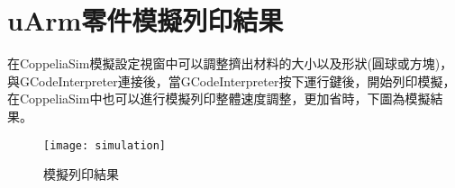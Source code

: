 \section{uArm零件模擬列印結果}
 在CoppeliaSim模擬設定視窗中可以調整擠出材料的大小以及形狀(圓球或方塊)，與GCodeInterpreter連接後，當GCodeInterpreter按下運行鍵後，開始列印模擬，在CoppeliaSim中也可以進行模擬列印整體速度調整，更加省時，下圖為模擬結果。\\
\begin{figure}[hbt!]
\begin{center}
\texttt{[image: simulation]}
\caption{\Large 模擬列印結果}\label{simulation}
\end{center}
\end{figure}

\newpage

